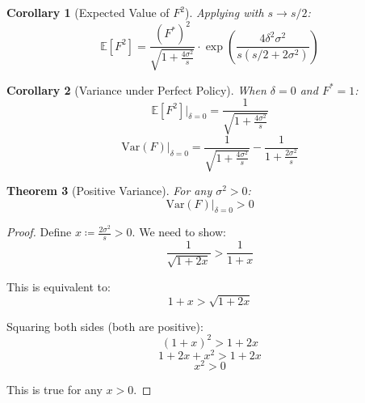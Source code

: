 \documentclass[11pt,a4paper]{article}
\newtheorem{theorem}{Theorem}
\newtheorem{corollary}[theorem]{Corollary}
\theoremstyle{definition}
\newcommand{\E}{\mathbb{E}}
\newcommand{\Var}{\mathrm{Var}}
\begin{document}
\begin{corollary}[Expected Value of $F^2$]
Applying  with $s \to s/2$:
\begin{equation}
    \E[F^2] = \frac{(F^*)^2}{\sqrt{1 + \frac{4\sigma^2}{s}}} \cdot \exp\left(\frac{4\delta^2\sigma^2}{s(s/2 + 2\sigma^2)}\right)
\end{equation}
\end{corollary}

\begin{corollary}[Variance under Perfect Policy]
When $\delta = 0$ and $F^* = 1$:
\begin{equation}
    \E[F^2]\big|_{\delta=0} = \frac{1}{\sqrt{1 + \frac{4\sigma^2}{s}}}
\end{equation}
\begin{equation}
    \Var(F)\big|_{\delta=0} = \frac{1}{\sqrt{1 + \frac{4\sigma^2}{s}}} - \frac{1}{1 + \frac{2\sigma^2}{s}}
\end{equation}
\end{corollary}

\begin{theorem}[Positive Variance]
\label{thm:positive-variance}
For any $\sigma^2 > 0$:
\begin{equation}
    \Var(F)\big|_{\delta=0} > 0
\end{equation}
\end{theorem}

\begin{proof}
Define $x \coloneqq \frac{2\sigma^2}{s} > 0$. We need to show:
\begin{equation}
    \frac{1}{\sqrt{1 + 2x}} > \frac{1}{1 + x}
\end{equation}

This is equivalent to:
\begin{equation}
    1 + x > \sqrt{1 + 2x}
\end{equation}

Squaring both sides (both are positive):
\begin{equation}
    (1 + x)^2 > 1 + 2x
\end{equation}
\begin{equation}
    1 + 2x + x^2 > 1 + 2x
\end{equation}
\begin{equation}
    x^2 > 0
\end{equation}

This is true for any $x > 0$.
\end{proof}

\end{document}

